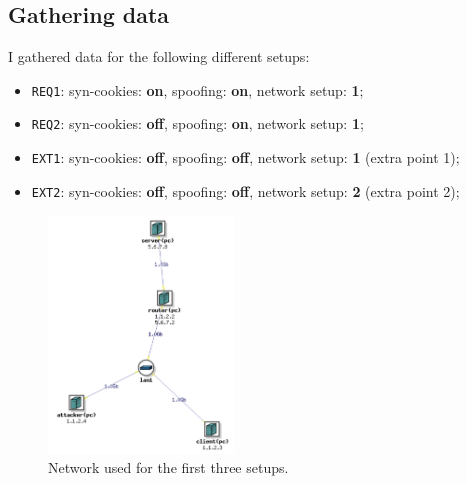 \documentclass[a4paper,11pt,hidelinks]{article}
\begin{document}

\subsection{Gathering data}

I gathered data for the following different setups:

\begin{itemize}
  \item \verb=REQ1=: syn-cookies: \textbf{on}, spoofing: \textbf{on}, network setup: \textbf{1};
  \item \verb=REQ2=: syn-cookies: \textbf{off}, spoofing: \textbf{on}, network setup: \textbf{1};
  \item \verb=EXT1=: syn-cookies: \textbf{off}, spoofing: \textbf{off}, network setup: \textbf{1} (extra point 1); 
  \item \verb=EXT2=: syn-cookies: \textbf{off}, spoofing: \textbf{off}, network setup: \textbf{2} (extra point 2);
\end{itemize}

\begin{figure}[h!]
  \centering
  \includegraphics[width=0.44\textwidth]{../drawable/network.png}
  \caption{Network used for the first three setups.}
\end{figure}
\end{document}
